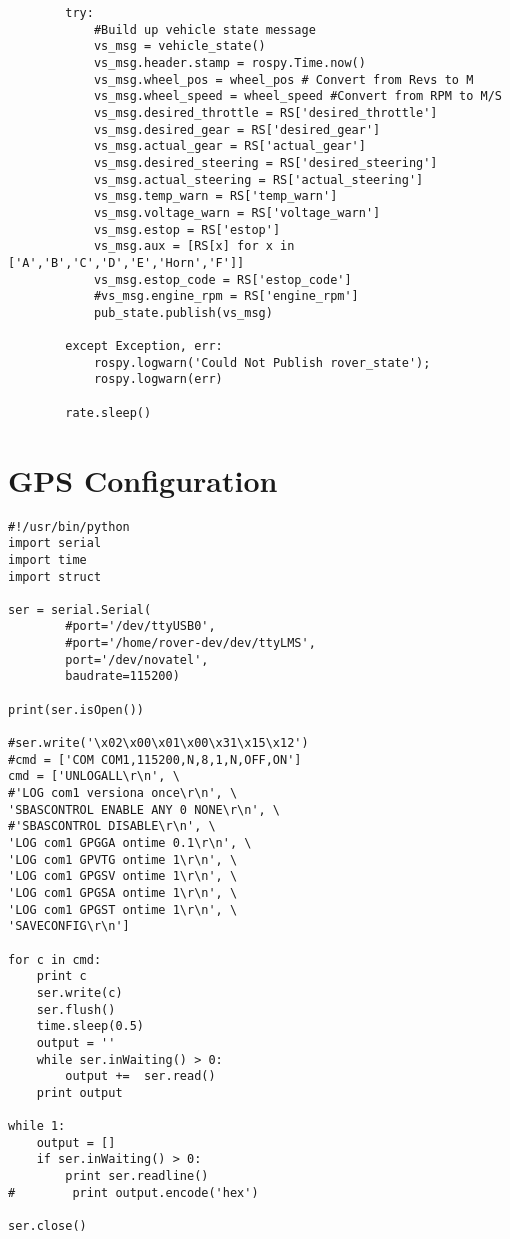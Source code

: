 \begin{verbatim}
        try:
            #Build up vehicle state message
            vs_msg = vehicle_state()
            vs_msg.header.stamp = rospy.Time.now()
            vs_msg.wheel_pos = wheel_pos # Convert from Revs to M
            vs_msg.wheel_speed = wheel_speed #Convert from RPM to M/S
            vs_msg.desired_throttle = RS['desired_throttle']
            vs_msg.desired_gear = RS['desired_gear']
            vs_msg.actual_gear = RS['actual_gear']
            vs_msg.desired_steering = RS['desired_steering']
            vs_msg.actual_steering = RS['actual_steering']
            vs_msg.temp_warn = RS['temp_warn']
            vs_msg.voltage_warn = RS['voltage_warn']
            vs_msg.estop = RS['estop']
            vs_msg.aux = [RS[x] for x in ['A','B','C','D','E','Horn','F']]
            vs_msg.estop_code = RS['estop_code']
            #vs_msg.engine_rpm = RS['engine_rpm']
            pub_state.publish(vs_msg)

        except Exception, err:
            rospy.logwarn('Could Not Publish rover_state');
            rospy.logwarn(err)

        rate.sleep()
\end{verbatim}


\section{GPS Configuration}
\begin{verbatim}
#!/usr/bin/python
import serial
import time
import struct

ser = serial.Serial(
        #port='/dev/ttyUSB0',
        #port='/home/rover-dev/dev/ttyLMS',
        port='/dev/novatel',
        baudrate=115200)

print(ser.isOpen())

#ser.write('\x02\x00\x01\x00\x31\x15\x12')
#cmd = ['COM COM1,115200,N,8,1,N,OFF,ON']
cmd = ['UNLOGALL\r\n', \
#'LOG com1 versiona once\r\n', \
'SBASCONTROL ENABLE ANY 0 NONE\r\n', \
#'SBASCONTROL DISABLE\r\n', \
'LOG com1 GPGGA ontime 0.1\r\n', \
'LOG com1 GPVTG ontime 1\r\n', \
'LOG com1 GPGSV ontime 1\r\n', \
'LOG com1 GPGSA ontime 1\r\n', \
'LOG com1 GPGST ontime 1\r\n', \
'SAVECONFIG\r\n']

for c in cmd:
    print c
    ser.write(c)
    ser.flush()
    time.sleep(0.5)
    output = ''
    while ser.inWaiting() > 0:
        output +=  ser.read() 
    print output

while 1:
    output = []
    if ser.inWaiting() > 0:
        print ser.readline()
#        print output.encode('hex')

ser.close()
\end{verbatim}


